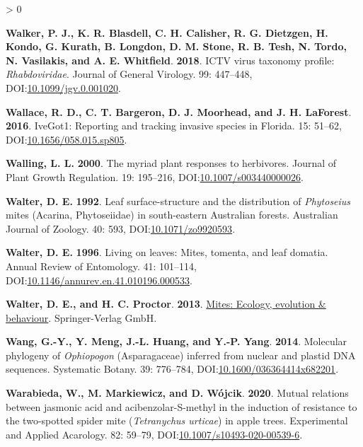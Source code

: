 \documentclass{ufdissertation}[overrideChapters] %
\newlength{\cslhangindent}
\newenvironment{CSLReferences}[2] %
 {%
  \setlength{\parindent}{0pt}
  \ifodd #1 \everypar{\setlength{\hangindent}{\cslhangindent}}\ignorespaces\fi
  \ifnum #2 > 0
  \setlength{\parskip}{#2\baselineskip}
  \fi
 }%
 {}
\begin{document}
{\begin{CSLReferences}{1}{1}
\leavevmode{}%
\textbf{Walker, P. J., K. R. Blasdell, C. H. Calisher, R. G. Dietzgen, H. Kondo, G. Kurath, B. Longdon, D. M. Stone, R. B. Tesh, N. Tordo, N. Vasilakis, and A. E. Whitfield}. \textbf{2018}. {ICTV} virus taxonomy profile: {\emph{Rhabdoviridae}}. Journal of General Virology. 99: 447--448, DOI:\href{https://doi.org/10.1099/jgv.0.001020}{10.1099/jgv.0.001020}.

\leavevmode{}%
\textbf{Wallace, R. D., C. T. Bargeron, D. J. Moorhead, and J. H. LaForest}. \textbf{2016}. {IveGot}1: Reporting and tracking invasive species in {Florida}. 15: 51--62, DOI:\href{https://doi.org/10.1656/058.015.sp805}{10.1656/058.015.sp805}.

\leavevmode{}%
\textbf{Walling, L. L.} \textbf{2000}. The myriad plant responses to herbivores. Journal of Plant Growth Regulation. 19: 195--216, DOI:\href{https://doi.org/10.1007/s003440000026}{10.1007/s003440000026}.

\leavevmode{}%
\textbf{Walter, D. E.} \textbf{1992}. Leaf surface-structure and the distribution of {\emph{Phytoseius}} mites ({Acarina}, {Phytoseiidae}) in south-eastern {Australian} forests. Australian Journal of Zoology. 40: 593, DOI:\href{https://doi.org/10.1071/zo9920593}{10.1071/zo9920593}.

\leavevmode{}%
\textbf{Walter, D. E.} \textbf{1996}. Living on leaves: Mites, tomenta, and leaf domatia. Annual Review of Entomology. 41: 101--114, DOI:\href{https://doi.org/10.1146/annurev.en.41.010196.000533}{10.1146/annurev.en.41.010196.000533}.

\leavevmode{}%
\textbf{Walter, D. E., and H. C. Proctor}. \textbf{2013}. \href{https://www.ebook.de/de/product/20725813/david_evans_walter_heather_c_proctor_mites_ecology_evolution_behaviour.html}{Mites: Ecology, evolution \& behaviour}. Springer-Verlag GmbH.

\leavevmode{}%
\textbf{Wang, G.-Y., Y. Meng, J.-L. Huang, and Y.-P. Yang}. \textbf{2014}. Molecular phylogeny of {\emph{Ophiopogon}} {({Asparagaceae})} inferred from nuclear and plastid {DNA} sequences. Systematic Botany. 39: 776--784, DOI:\href{https://doi.org/10.1600/036364414x682201}{10.1600/036364414x682201}.

\leavevmode{}%
\textbf{Warabieda, W., M. Markiewicz, and D. Wójcik}. \textbf{2020}. Mutual relations between jasmonic acid and acibenzolar-{S}-methyl in the induction of resistance to the two-spotted spider mite ({\emph{Tetranychus urticae}}) in apple trees. Experimental and Applied Acarology. 82: 59--79, DOI:\href{https://doi.org/10.1007/s10493-020-00539-6}{10.1007/s10493-020-00539-6}.


\end{CSLReferences}}
\end{document}
